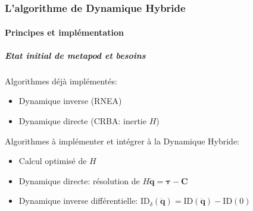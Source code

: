 \documentclass[10pt]{beamer}
\begin{document}

\part{}
\section{L'algorithme de Dynamique Hybride}

\subsection{Principes et implémentation}

\begin{frame}
  \frametitle{Etat initial de metapod et besoins}
 
  Algorithmes déjà implémentés:
  \begin{itemize}
  \item Dynamique inverse (RNEA)
  \item Dynamique directe (CRBA: inertie $H$)
  \end{itemize}
  \bigskip
  Algorithmes à implémenter et intégrer à la Dynamique Hybride:
  \begin{itemize}
  \item Calcul optimisé de $H$
  \item Dynamique directe:	résolution de $H \boldsymbol{\ddot{q} = \tau - C}$
  \item Dynamique inverse différentielle: $\mathrm{ID}_{\delta}(\boldsymbol{\ddot{q}}) = \mathrm{ID}(\boldsymbol{\ddot{q}}) - \mathrm{ID}(0)$
  \end{itemize}
  
\end{frame}
\end{document}
